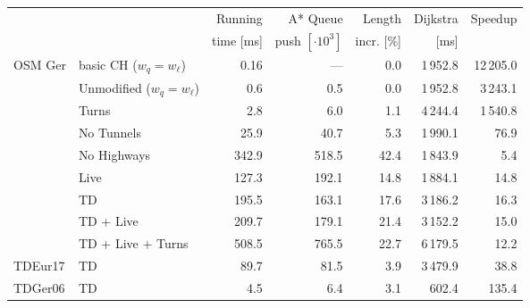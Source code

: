 \begin{tabular}{llrrrrr}
\toprule
 & &   Running &               A* Queue &     Length & Dijkstra & Speedup \\ & & time [ms] & push $[\cdot 10^3]$ & incr. [\%] &     [ms] &         \\
\midrule
\multirow{9}{*}{OSM Ger} & basic CH ($w_q=w_\ell$) &              0.16 &              --- &       0.0 &                    1\,952.8 &   12\,205.0 \\
 & Unmodified ($w_q=w_\ell$) &              0.6 &              0.5 &       0.0 &                    1\,952.8 &   3\,243.1 \\
        & Turns &              2.8 &              6.0 &       1.1 &                    4\,244.4 &   1\,540.8 \\
        & No Tunnels &             25.9 &             40.7 &       5.3 &                    1\,990.1 &     76.9 \\
        & No Highways &            342.9 &            518.5 &      42.4 &                    1\,843.9 &      5.4 \\
        & Live &            127.3 &            192.1 &      14.8 &                    1\,884.1 &     14.8 \\
        & TD &            195.5 &            163.1 &      17.6 &                    3\,186.2 &     16.3 \\
        & TD + Live &            209.7 &            179.1 &      21.4 &                    3\,152.2 &     15.0 \\
        & TD + Live + Turns &            508.5 &            765.5 &      22.7 &                    6\,179.5 &     12.2 \\
\addlinespace
TDEur17 & TD &             89.7 &             81.5 &       3.9 &                    3\,479.9 &     38.8 \\
TDGer06 & TD &              4.5 &              6.4 &       3.1 &                     602.4 &    135.4 \\
\bottomrule
\end{tabular}

